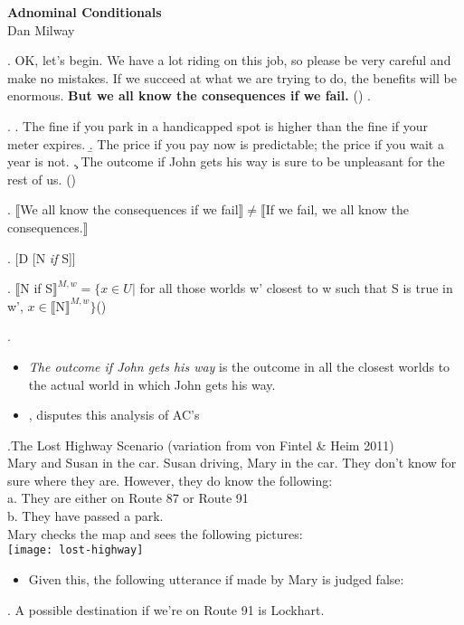 \documentclass[letterpaper]{article}
\begin{document}
\begin{center}
	\textbf{Adnominal Conditionals}\\
	Dan Milway
\end{center}
\ex. OK, let's begin.
We have a lot riding on this job, so please be very careful and make no mistakes.
If we succeed at what we are trying to do, the benefits will be enormous.
\textbf{But we all know the consequences if we fail.} \hfill (\cite{lasersohn1996adnominal})
\z.

\ex.
\a. The fine if you park in a handicapped spot is higher than the fine if your
meter expires.
\b. The price if you pay now is predictable; the price if you wait a year is not.
\c. The outcome if John gets his way is sure to be unpleasant for the rest of
us. \hfill (\cite{lasersohn1996adnominal})

\ex. $\llbracket$We all know the consequences if we fail$\rrbracket \neq \llbracket$If we fail, we all know the consequences.$\rrbracket$

\ex. [D [N \textit{if} S]]

\ex. $\llbracket$N if S$\rrbracket^{M,w} = \{x \in U |$ for all those worlds w' closest to w such that S is true in w', $x \in \llbracket$N$\rrbracket^{M,w}\}$\hfill(\cite{lasersohn1996adnominal})

\ex. 

\begin{itemize}
	\item \textit{The outcome if John gets his way} is the outcome in all the closest worlds to the actual world in which John gets his way.
	\item \textcite{franaappearmodality}, disputes this analysis of AC's
\end{itemize}
\ex.The Lost Highway Scenario (variation from von Fintel \& Heim 2011)\\
Mary and Susan in the car. Susan driving, Mary in the car. They don’t know for sure where they are. However, they do know the following:\\
a. They are either on Route 87 or Route 91\\
b. They have passed a park.\\
Mary checks the map and sees the following pictures:\\
\texttt{[image: lost-highway]}

\begin{itemize}
	\item Given this, the following utterance if made by Mary is judged false:
\end{itemize}
\ex. A possible destination if we're on Route 91 is Lockhart.
\end{document}
